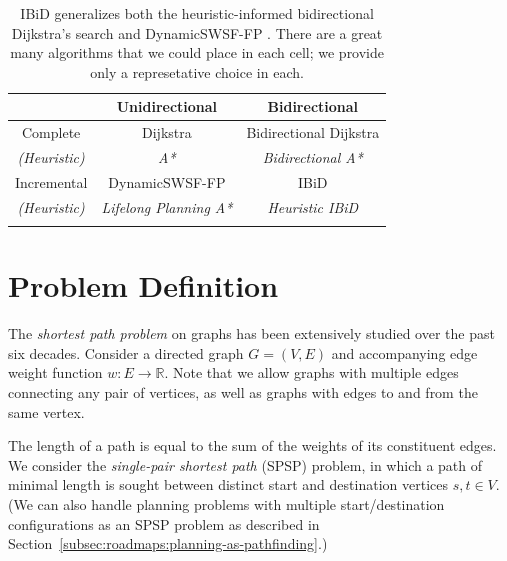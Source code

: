 \begin{table}
   \centering
   \begin{tabular}{ccc}
      \toprule
      & Unidirectional & Bidirectional \\
      \midrule
      \addlinespace[0.2em]
      Complete
         & Dijkstra \citep{dijkstra1959anote}
         & Bidirectional Dijkstra \citep{luby1989bidijk} \\
      \addlinespace[-0.2em]
      \emph{(Heuristic)}
         & \emph{A* \citep{hart1968astar}}
         & \emph{Bidirectional A* \citep{ikeda1994betterroutes}} \\
      \addlinespace[0.3em]
      Incremental
         & DynamicSWSF-FP \citep{ramalingam1996dynamicswsffp}
         & {IBiD} \\
      \addlinespace[-0.2em]
      \emph{(Heuristic)}
         & \emph{Lifelong Planning A* \citep{koenig2004lpastar}}
         & \emph{Heuristic IBiD} \\
      \addlinespace[0.2em]
      \bottomrule
   \end{tabular}
   \caption{
      IBiD generalizes both the heuristic-informed
      bidirectional Dijkstra's search \citep{goldberg2005spexternalmemory}
      and DynamicSWSF-FP \citep{ramalingam1996dynamicswsffp}.
      There are a great many algorithms that we could place in each cell;
      we provide only a represetative choice in each.}
   \label{tab:ibid:alg-overview}
\end{table}

\section{Problem Definition}
\label{subsec:ibid-probdef}

The \emph{shortest path problem} on graphs has been extensively
studied over the past six decades.
Consider a directed graph $G = (V,E)$ and accompanying edge weight
function $w : E \rightarrow \mathbb{R}$.
Note that we allow graphs with multiple edges connecting any pair
of vertices,
as well as graphs with edges to and from the same vertex.

The length of a path is equal to the sum of the weights of its
constituent edges.
We consider the \emph{single-pair shortest path} (SPSP) problem,
in which a path of minimal length is sought
between distinct start and destination vertices
$s,t \in V$.
(We can also handle planning problems with multiple
start/destination configurations as an SPSP problem
as described in Section~\ref{subsec:roadmaps:planning-as-pathfinding}.)

